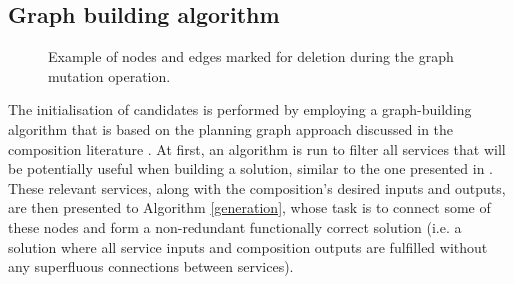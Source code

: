 \documentclass{article}
\begin{document}
\subsection{Graph building algorithm}

\begin{figure}
\centerline{
}
\caption{Example of nodes and edges marked for deletion during the graph mutation operation.}
\label{fig:mutationExample}
\end{figure}

The initialisation of candidates is performed by employing a graph-building algorithm that is based on
the planning graph approach discussed in the composition literature \cite{chen2014qos,deng2013efficient,huang2009effective}.
At first, an algorithm is run to filter all services that will be potentially useful when building a solution, similar
to the one presented in \cite{wang2013genetic}. These relevant services, along with the composition's desired inputs and outputs, are
then presented to Algorithm \ref{generation}, whose task is to connect some of these nodes and form a non-redundant functionally
correct solution (i.e. a solution where all service inputs and composition outputs are fulfilled without any superfluous connections
between services).
\end{document}
